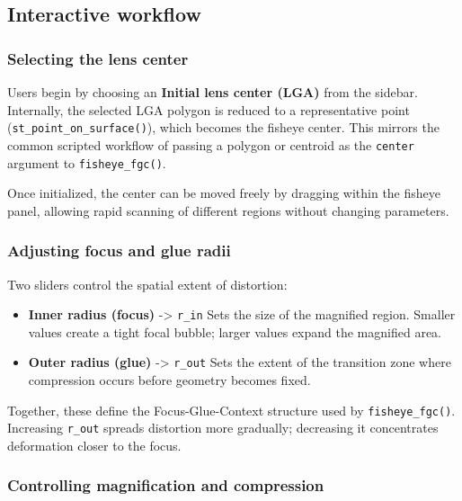 \subsection{Interactive workflow}\label{interactive-workflow}

\subsubsection{Selecting the lens center}\label{selecting-the-lens-center}

Users begin by choosing an \textbf{Initial lens center (LGA)} from the sidebar. Internally, the selected LGA polygon is reduced to a representative point (\texttt{st\_point\_on\_surface()}), which becomes the fisheye center. This mirrors the common scripted workflow of passing a polygon or centroid as the \texttt{center} argument to \texttt{fisheye\_fgc()}.

Once initialized, the center can be moved freely by dragging within the fisheye panel, allowing rapid scanning of different regions without changing parameters.

\subsubsection{Adjusting focus and glue radii}\label{adjusting-focus-and-glue-radii}

Two sliders control the spatial extent of distortion:

\begin{itemize}
\tightlist
\item
  \textbf{Inner radius (focus)} -\textgreater{} \texttt{r\_in} Sets the size of the magnified region. Smaller values create a tight focal bubble; larger values expand the magnified area.
\item
  \textbf{Outer radius (glue)} -\textgreater{} \texttt{r\_out} Sets the extent of the transition zone where compression occurs before geometry becomes fixed.
\end{itemize}

Together, these define the Focus-Glue-Context structure used by \texttt{fisheye\_fgc()}. Increasing \texttt{r\_out} spreads distortion more gradually; decreasing it concentrates deformation closer to the focus.

\subsubsection{Controlling magnification and compression}\label{controlling-magnification-and-compression}

